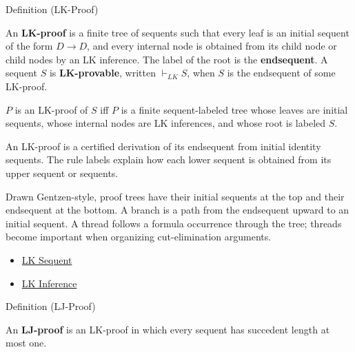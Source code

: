 \begin{definitionbox}{Definition (LK-Proof)}
\begin{definition}[LK-Proof]\label{def:lk-proof}
An \textbf{LK-proof} is a finite tree of sequents such that every leaf is an
initial sequent of the form $D \to D$, and every internal node is obtained
from its child node or child nodes by an LK inference. The label of the root is
the \textbf{endsequent}. A sequent $S$ is \textbf{LK-provable}, written
$\vdash_{LK} S$, when $S$ is the endsequent of some LK-proof.
\end{definition}
\end{definitionbox}

\begin{remark*}
$P$ is an LK-proof of $S$ iff $P$ is a finite sequent-labeled tree whose
leaves are initial sequents, whose internal nodes are LK inferences, and whose
root is labeled $S$.
\end{remark*}

\begin{remark*}[Interpretation]
An LK-proof is a certified derivation of its endsequent from initial identity
sequents. The rule labels explain how each lower sequent is obtained from its
upper sequent or sequents.
\end{remark*}

\begin{remark*}[Exposition]
Drawn Gentzen-style, proof trees have their initial sequents at the top and
their endsequent at the bottom. A branch is a path from the endsequent upward
to an initial sequent. A thread follows a formula occurrence through the tree;
threads become important when organizing cut-elimination arguments.
\end{remark*}

\begin{dependencies}
\begin{itemize}
  \item \hyperref[def:lk-sequent]{LK Sequent}
  \item \hyperref[def:lk-inference]{LK Inference}
\end{itemize}
\end{dependencies}

\begin{definitionbox}{Definition (LJ-Proof)}
\begin{definition}[LJ-Proof]\label{def:lj-proof}
An \textbf{LJ-proof} is an LK-proof in which every sequent has succedent length
at most one.
\end{definition}
\end{definitionbox}

